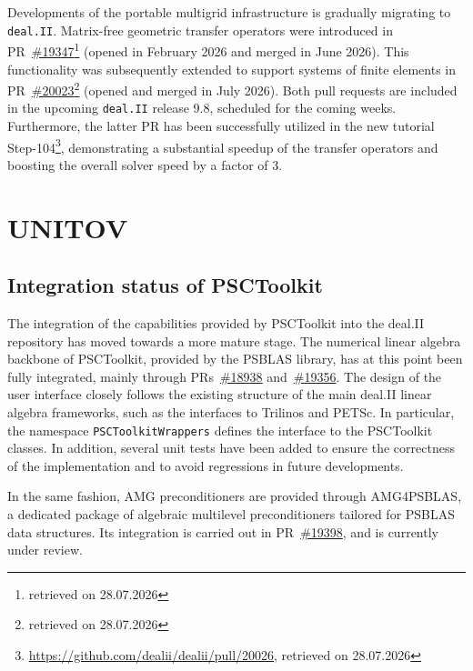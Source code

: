 \documentclass[a4paper,12pt]{article}
\begin{document}
Developments of the portable multigrid infrastructure is gradually migrating to \texttt{deal.II}. Matrix-free geometric transfer operators were introduced in PR~\href{https://github.com/dealii/dealii/pull/19347}{\#19347}\footnote{retrieved on 28.07.2026} (opened in February 2026 and merged in June 2026). This functionality was subsequently extended to support systems of finite elements in PR~\href{https://github.com/dealii/dealii/pull/20023}{\#20023}\footnote{retrieved on 28.07.2026} (opened and merged in July 2026). Both pull requests are included in the upcoming \texttt{deal.II} release 9.8, scheduled for the coming weeks. Furthermore, the latter PR has been successfully utilized in the new tutorial Step-104\footnote{\url{https://github.com/dealii/dealii/pull/20026}, retrieved on 28.07.2026}, demonstrating a substantial speedup of the transfer operators and boosting the overall solver speed by a factor of 3.

\newpage

\section{UNITOV}
\label{sec:section6}

\subsection{Integration status of PSCToolkit}
The integration of the capabilities provided by PSCToolkit into the deal.II repository has moved
towards a more mature stage. The numerical linear algebra backbone of PSCToolkit, provided by the PSBLAS library, has
at this point been fully integrated, mainly through PRs~\href{https://github.com/dealii/dealii/pull/18938}{\#18938} and~\href{https://github.com/dealii/dealii/pull/19356}{\#19356}. The design of the user interface
closely follows the existing structure of the main deal.II linear algebra frameworks, such as the
interfaces to Trilinos and PETSc. In particular, the namespace \texttt{PSCToolkitWrappers} defines the
interface to the PSCToolkit classes. In addition, several unit tests have been added to ensure the correctness of the implementation
and to avoid regressions in future developments.

In the same fashion, AMG preconditioners are provided through AMG4PSBLAS, a dedicated package
of algebraic multilevel preconditioners tailored for PSBLAS data structures. Its integration is
carried out in PR~\href{https://github.com/dealii/dealii/pull/19398}{\#19398}, and is currently under review.
\end{document}
